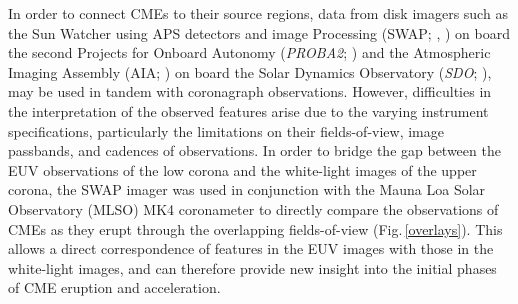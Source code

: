 \documentclass[namedreferences]{solarphysics}
\begin{document}
\begin{article}
In order to connect CMEs to their source regions, data from disk imagers such as the Sun Watcher using APS detectors and image Processing (SWAP; , ) on board the second Projects for Onboard Autonomy (\emph{PROBA2}; ) and the Atmospheric Imaging Assembly (AIA; ) on board the Solar Dynamics Observatory (\emph{SDO}; ), may be used in tandem with coronagraph observations. However, difficulties in the interpretation of the observed features arise due to the varying instrument specifications, particularly the limitations on their fields-of-view, image passbands, and cadences of observations. In order to bridge the gap between the EUV observations of the low corona and the white-light images of the upper corona, the SWAP imager was used in conjunction with the Mauna Loa Solar Observatory (MLSO) MK4 coronameter \cite{2003SPIE.4843...66E} to directly compare the observations of CMEs as they erupt through the overlapping fields-of-view (Fig.\,\ref{overlays}). This allows a direct correspondence of features in the EUV images with those in the white-light images, and can therefore provide new insight into the initial phases of CME eruption and acceleration.


\end{article}
\end{document}

